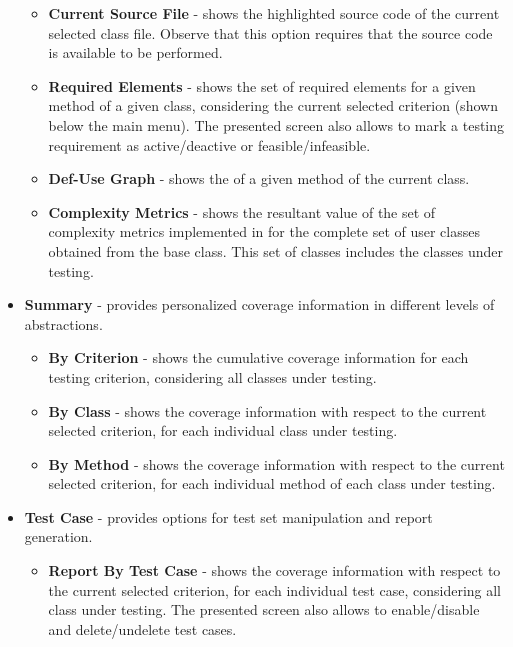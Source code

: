 \begin{itemize}
\begin{itemize}
            \item \textbf{Current Source File} - shows the highlighted source code of the
            current selected class file. Observe that this option requires that the source
            code is available to be performed.

            \item \textbf{Required Elements} - shows the set of required elements
            for a given method of a given class, considering the current selected
            criterion (shown below the main menu). The presented
            screen also allows to mark a testing requirement as active/deactive or
            feasible/infeasible.

            \item \textbf{Def-Use Graph} - shows the \DUG
            of a given method of the current class.

            \item \textbf{Complexity Metrics} - shows the resultant value of
            the set of complexity metrics implemented in \toolname for the
            complete set of user classes obtained from the base class.
            This set of classes includes the classes under testing.
        \end{itemize}

    \item \textbf{Summary} - provides personalized coverage information
        in different levels of abstractions.
        \begin{itemize}
            \item \textbf{By Criterion} - shows the cumulative coverage
            information for each testing criterion, considering all classes
            under testing.

            \item \textbf{By Class} - shows the coverage
            information with respect to the current selected criterion,
            for each individual class under testing.

            \item \textbf{By Method} - shows the coverage
            information with respect to the current selected criterion,
            for each individual method of each class under testing.
        \end{itemize}

    \item \textbf{Test Case} - provides options for test set
    manipulation and report generation.
        \begin{itemize}
            \item \textbf{Report By Test Case} - shows the coverage
            information with respect to the current selected criterion,
            for each individual test case, considering all class under
            testing. The presented screen also allows to enable/disable and
            delete/undelete test cases.


\end{itemize}
\end{itemize}
